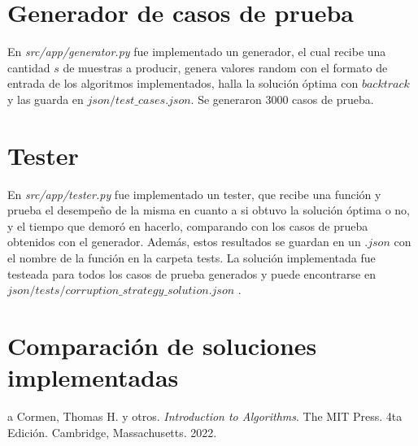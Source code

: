 \documentclass[10pt]{article} %
\begin{document}
	\section{Generador de casos de prueba}
	
	En \textit{src/app/generator.py} fue implementado un generador, el cual recibe una cantidad $ s $ de muestras a producir, genera valores random con el formato de entrada de los algoritmos implementados, halla la soluci\'on \'optima con $ backtrack $ y las guarda en $ json/test\_cases.json $. Se generaron 3000 casos de prueba.
	
	\section{Tester}
	En \textit{src/app/tester.py} fue implementado un tester, que recibe una funci\'on y prueba el desempe\~no de la misma en cuanto a si obtuvo la soluci\'on \'optima o no, y el tiempo que demor\'o en hacerlo, comparando con los casos de prueba obtenidos con el generador. Adem\'as, estos resultados se guardan en un $ .json $ con el nombre de la funci\'on en la carpeta tests. La soluci\'on implementada fue testeada para todos los casos de prueba generados y puede encontrarse en $ json/tests/corruption\_strategy\_solution.json $ .
	
	\section{Comparaci\'on de soluciones implementadas}          

%    
%    
%    
%	
	
	\begin{thebibliography}
		a
		 Cormen, Thomas H. y otros. \emph{Introduction to Algorithms}. 
		The MIT Press.
		4ta Edici\'on.		
		Cambridge, Massachusetts.
		2022.
	\end{thebibliography}
\end{document}
